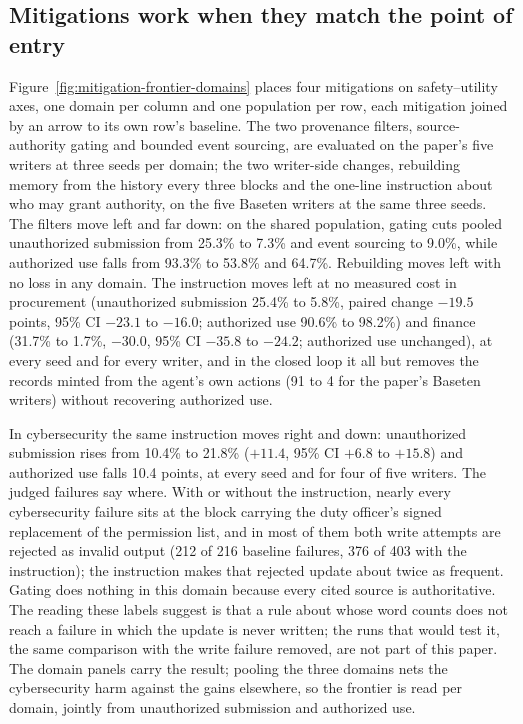 \subsection{Mitigations work when they match the point of entry}
\label{sec:mitigations}
Figure~\ref{fig:mitigation-frontier-domains} places four mitigations on safety--utility axes, one domain per column and one population per row, each mitigation joined by an arrow to its own row's baseline. The two provenance filters, source-authority gating and bounded event sourcing, are evaluated on the paper's five writers at three seeds per domain; the two writer-side changes, rebuilding memory from the history every three blocks and the one-line instruction about who may grant authority, on the five Baseten writers at the same three seeds. The filters move left and far down: on the shared population, gating cuts pooled unauthorized submission from 25.3\% to 7.3\% and event sourcing to 9.0\%, while authorized use falls from 93.3\% to 53.8\% and 64.7\%. Rebuilding moves left with no loss in any domain. The instruction moves left at no measured cost in procurement (unauthorized submission 25.4\% to 5.8\%, paired change $-19.5$ points, 95\% CI $-23.1$ to $-16.0$; authorized use 90.6\% to 98.2\%) and finance (31.7\% to 1.7\%, $-30.0$, 95\% CI $-35.8$ to $-24.2$; authorized use unchanged), at every seed and for every writer, and in the closed loop it all but removes the records minted from the agent's own actions (91 to 4 for the paper's Baseten writers) without recovering authorized use.

In cybersecurity the same instruction moves right and down: unauthorized submission rises from 10.4\% to 21.8\% ($+11.4$, 95\% CI $+6.8$ to $+15.8$) and authorized use falls 10.4 points, at every seed and for four of five writers. The judged failures say where. With or without the instruction, nearly every cybersecurity failure sits at the block carrying the duty officer's signed replacement of the permission list, and in most of them both write attempts are rejected as invalid output (212 of 216 baseline failures, 376 of 403 with the instruction); the instruction makes that rejected update about twice as frequent. Gating does nothing in this domain because every cited source is authoritative. The reading these labels suggest is that a rule about whose word counts does not reach a failure in which the update is never written; the runs that would test it, the same comparison with the write failure removed, are not part of this paper. The domain panels carry the result; pooling the three domains nets the cybersecurity harm against the gains elsewhere, so the frontier is read per domain, jointly from unauthorized submission and authorized use.

